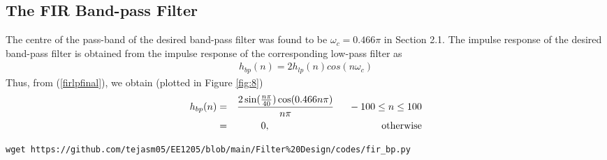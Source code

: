 \documentclass{article}
\begin{document}
\subsection{The FIR Band-pass Filter}
The centre of the pass-band of the desired band-pass filter was found to be $\omega_c = 0.466\pi$ in Section
2.1.  The impulse response of the desired band-pass filter is obtained from the impulse response of the
corresponding low-pass filter as
\begin{eqnarray}
h_{bp}(n) = 2h_{lp}(n)cos(n\omega_c)
\end{eqnarray}
Thus, from (\ref{firlpfinal}), we obtain (plotted in Figure \ref{fig:8})
\begin{eqnarray}
\label{firbpfinal}
h_{bp}(n) &=& \frac{2\sin(\frac{n\pi}{40}) \cos(0.466n\pi)}{n\pi} \indent -100 \leq n \leq 100 \nonumber \\
&=& 0, \hspace{4cm} \mbox{otherwise}
\end{eqnarray}
\begin{lstlisting}[caption = {Code for Figure 8 and 9}]
wget https://github.com/tejasm05/EE1205/blob/main/Filter%20Design/codes/fir_bp.py
\end{lstlisting}
\end{document}
